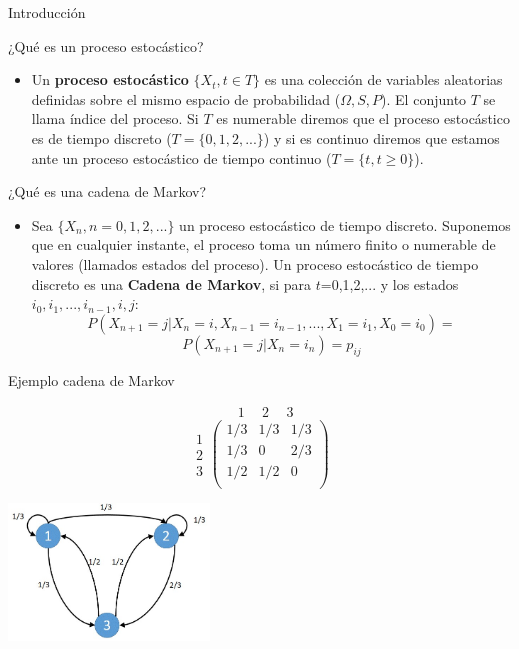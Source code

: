 
\begin{frame}
	\centering \LARGE \color{naranjaUCA} Introducción
\end{frame}
\begin{frame}{¿Qué es un proceso estocástico?}
	
\begin{itemize}
	\item Un \textbf{proceso estocástico }$\lbrace X_t, t \in T \rbrace$ es una colección de variables aleatorias definidas sobre el mismo espacio de probabilidad ($\Omega,S,P$). El conjunto $T$ se llama índice del proceso. Si $T$ es numerable diremos que el proceso estocástico es de tiempo discreto ($T=\lbrace 0,1,2,... \rbrace$) y si es continuo diremos que estamos ante un proceso estocástico de tiempo continuo ($T=\lbrace t, t\geq 0 \rbrace$).
	
\end{itemize}

\end{frame}
\begin{frame}{¿Qué es una cadena de Markov?}
	\begin{itemize}
		\item Sea $\lbrace X_n, n=0,1,2,...\rbrace$ un proceso estocástico de tiempo discreto. Suponemos que en cualquier instante, el proceso toma un número finito o numerable de valores (llamados estados del proceso).
		Un proceso estocástico de tiempo discreto es una \textbf{Cadena de Markov}, si para $t$=0,1,2,... y los estados $i_0, i_1,...,i_{n-1},i,j$:
		\pause
		$$
		P(X_{n+1}=j|X_n=i, X_{n-1}=i_{n-1},...,X_1=i_1, X_0=i_0)=
		$$ $$P(X_{n+1}=j|X_n=i_n)=p_{ij}
		$$
	\end{itemize}
\end{frame}

\begin{frame}{Ejemplo cadena de Markov}
	
	$$ 	\begin{array}{cccc}
	& 1 ~~ & 2 ~~ &  3
	\end{array}
	$$
	$$
	\begin{array}{c}
	1 \\ 2 \\ 3
	\end{array}
	\left(
	\begin{array}{ccc}
	1/3 & 1/3 & 1/3 \\
	1/3 & 0 & 2/3 \\
	1/2 & 1/2 & 0 \\
	\end{array}
	\right)
	$$
	
	\pause
		\centering
		\includegraphics[width=0.4\textwidth]{grafo1}
		\label{grf1}
\end{frame}

